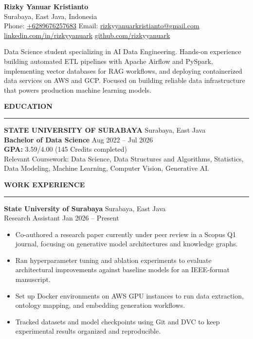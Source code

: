 \documentclass[a4paper,10pt]{article}
\newcommand{\cvsection}[1]{%
    \vspace{5pt}%
    {\fontsize{10.5pt}{12pt}\selectfont \textbf{#1}}\\[-4pt]%
    \rule{\textwidth}{0.5pt}%
    \vspace{2.5pt}%
}
\begin{document}
\begin{center}
    {\fontsize{15.5pt}{18pt}\selectfont \textbf{Rizky Yanuar Kristianto}} \\[3pt]
    Surabaya, East Java, Indonesia \\
    Phone: \href{tel:+6289676257683}{+6289676257683} \;\textbar\;
    Email: \href{mailto:rizkyyanuarkristianto@gmail.com}{rizkyyanuarkristianto@gmail.com} \\[2pt]
    \href{https://www.linkedin.com/in/rizkyyanuark}{linkedin.com/in/rizkyyanuark} \;\textbar\;
    \href{https://github.com/rizkyyanuark}{github.com/rizkyyanuark}
\end{center}

\vspace{3pt}
Data Science student specializing in AI Data Engineering. Hands-on experience building automated ETL pipelines with Apache Airflow and PySpark, implementing vector databases for RAG workflows, and deploying containerized data services on AWS and GCP. Focused on building reliable data infrastructure that powers production machine learning models.

\cvsection{EDUCATION}

\textbf{STATE UNIVERSITY OF SURABAYA} \hfill Surabaya, East Java \\
\textbf{Bachelor of Data Science} \hfill Aug 2022 -- Jul 2026 \\
\textbf{GPA:} 3.59/4.00 (145 Credits completed) \\
Relevant Coursework: Data Science, Data Structures and Algorithms, Statistics, Data Modeling, Machine Learning, Computer Vision, Generative AI.

\cvsection{WORK EXPERIENCE}

\textbf{State University of Surabaya} \hfill Surabaya, East Java \\
Research Assistant \hfill Jan 2026 -- Present
\begin{itemize}
    \item Co-authored a research paper currently under peer review in a Scopus Q1 journal, focusing on generative model architectures and knowledge graphs.
    \item Ran hyperparameter tuning and ablation experiments to evaluate architectural improvements against baseline models for an IEEE-format manuscript.
    \item Set up Docker environments on AWS GPU instances to run data extraction, ontology mapping, and embedding generation workflows.
    \item Tracked datasets and model checkpoints using Git and DVC to keep experimental results organized and reproducible.
\end{itemize}
\end{document}
